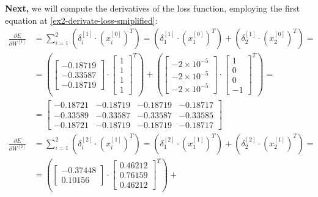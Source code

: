 \documentclass[12pt]{article}
\begin{document}
\begin{enumerate}[leftmargin=\labelsep]
        \textbf{Next,} we will compute the derivatives of the loss function, employing the first equation at \eqref{ex2-derivate-loss-smiplified}:
        \begingroup
        \allowdisplaybreaks
        \begin{align*}
          \frac{\partial E}{\partial W^{[1]}} & = \sum_{i=1}^{2} \left(\delta^{[1]}_i \cdot \left(x^{[0]}_i\right)^{T}\right)
          = \left(\delta^{[1]}_1 \cdot \left(x^{[0]}_1\right)^{T}\right) + \left(\delta^{[1]}_2 \cdot \left(x^{[0]}_2\right)^{T}\right) =                                                                         \\
                                              & = \left(\begin{bmatrix} -0.18719 \\ -0.33587 \\ -0.18719 \end{bmatrix} \cdot \begin{bmatrix} 1 \\ 1 \\ 1 \\ 1\end{bmatrix}^{T}\right) +
          \left(\begin{bmatrix} -2 \times 10^{-5} \\ -2 \times 10^{-5} \\ -2 \times 10^{-5}  \end{bmatrix} \cdot \begin{bmatrix} 1 \\ 0 \\ 0 \\ -1\end{bmatrix}^{T}\right) =                                      \\
                                              & = \begin{bmatrix} -0.18721 & -0.18719 & -0.18719 & -0.18717\\ -0.33589 & -0.33587 & -0.33587 & -0.33585 \\ -0.18721 & -0.18719 & -0.18719 & -0.18717\end{bmatrix} \\
          \frac{\partial E}{\partial W^{[2]}} & = \sum_{i=1}^{2} \left(\delta^{[2]}_i \cdot \left(x^{[1]}_i\right)^{T}\right)
          = \left(\delta^{[2]}_1 \cdot \left(x^{[1]}_1\right)^{T}\right) + \left(\delta^{[2]}_2 \cdot \left(x^{[1]}_2\right)^{T}\right) =                                                                         \\
                                              & = \left(\begin{bmatrix} -0.37448 \\ 0.10156 \end{bmatrix} \cdot \begin{bmatrix} 0.46212 \\ 0.76159 \\ 0.46212\end{bmatrix}^{T}\right) +

\end{align*}
\end{enumerate}
\end{document}
